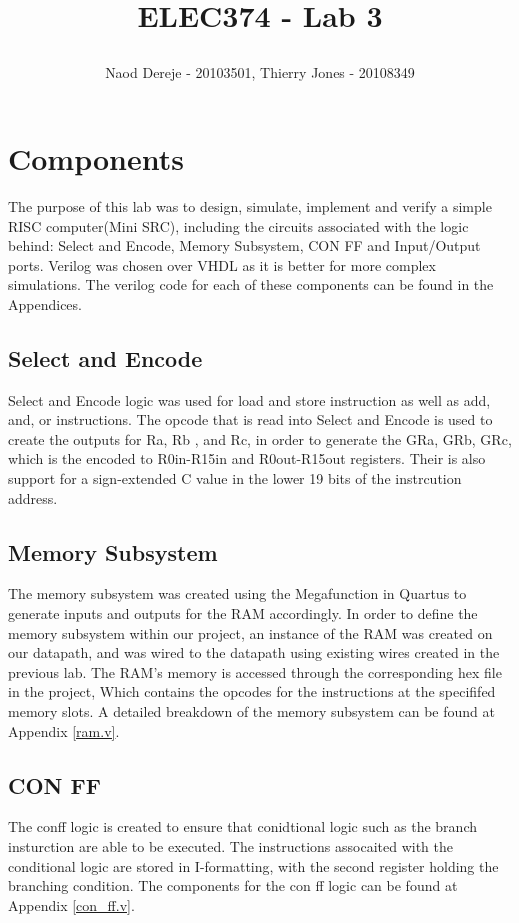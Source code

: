 \documentclass{article}
\title{
    \begin{large}
        ELEC374 - Lab 3
    \end{large}
}
\author{Naod Dereje - 20103501, Thierry Jones - 20108349}
\begin{document}
\maketitle
\cleardoublepage
\tableofcontents
\cleardoublepage

\section{Components}
    The purpose of this lab was to design, simulate, implement and verify a simple RISC computer(Mini SRC), including the circuits associated with the logic behind: 
    Select and Encode, Memory Subsystem, CON FF and Input/Output ports. Verilog was chosen over VHDL as it is better for more complex simulations. The verilog code 
    for each of these components can be found in the Appendices.
    
    \subsection{Select and Encode}
    Select and Encode logic was used for load and store instruction as well as add, and, or instructions. The opcode that is read into Select and Encode is used to create the outputs for Ra, Rb , and Rc, in order to generate the GRa, GRb, GRc, which is the encoded to R0in-R15in and R0out-R15out registers. Their is also support for a sign-extended C value in the lower 19 bits of the instrcution address.

    \subsection{Memory Subsystem}
    The memory subsystem was created using the Megafunction in Quartus to generate inputs and outputs for the RAM accordingly. In order to define the memory subsystem within our project, an instance of the RAM was created on our datapath, and was wired to the datapath using existing wires created in the previous lab. The RAM's memory is accessed through the corresponding hex file in the project, Which contains the opcodes for the instructions at the specififed memory slots. A detailed breakdown of the memory subsystem can be found at Appendix \ref{ram.v}.

    \subsection{CON FF}
    The conff logic is created to ensure that conidtional logic such as the branch insturction are able to be executed. The instructions assocaited with the conditional logic are stored in I-formatting, with the second register holding the branching condition. The components for the con ff logic can be found at Appendix \ref{con_ff.v}.
\end{document}
